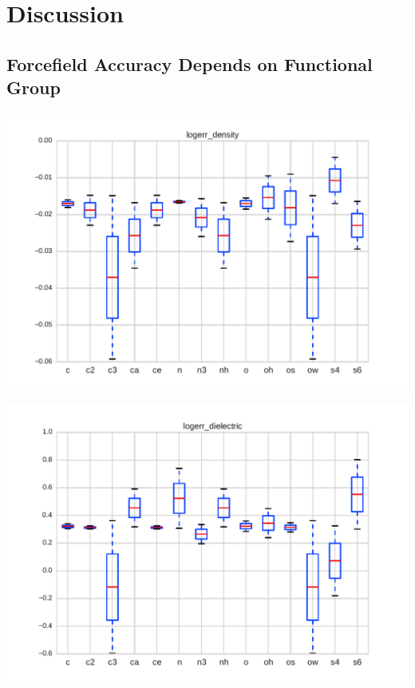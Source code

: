 \documentclass[journal=jacsat,manuscript=article]{achemso}
\begin{document}
\section{Discussion}

\subsection{Forcefield Accuracy Depends on Functional Group}

\includegraphics[width=\columnwidth]{./figures/functional_group_logerr_density.pdf}

\includegraphics[width=\columnwidth]{./figures/functional_group_logerr_dielectric.pdf}
\end{document}
